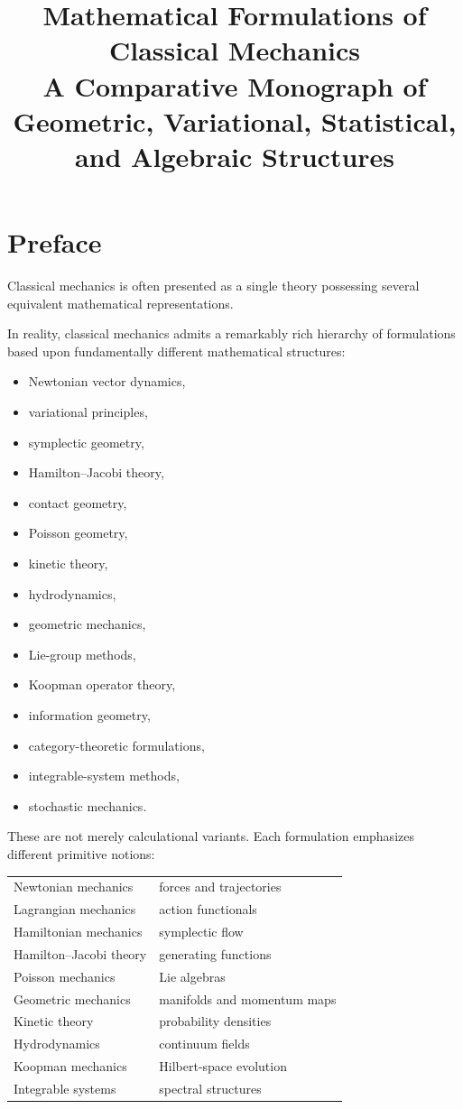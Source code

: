 \documentclass[11pt]{book}
\title{Mathematical Formulations of Classical Mechanics\\
A Comparative Monograph of Geometric, Variational, Statistical, and Algebraic Structures}
\author{}
\date{}
\begin{document}
\maketitle
\tableofcontents

\chapter*{Preface}

Classical mechanics is often presented as a single theory possessing several equivalent mathematical representations.

In reality, classical mechanics admits a remarkably rich hierarchy of formulations based upon fundamentally different mathematical structures:

\begin{itemize}
\item Newtonian vector dynamics,
\item variational principles,
\item symplectic geometry,
\item Hamilton--Jacobi theory,
\item contact geometry,
\item Poisson geometry,
\item kinetic theory,
\item hydrodynamics,
\item geometric mechanics,
\item Lie-group methods,
\item Koopman operator theory,
\item information geometry,
\item category-theoretic formulations,
\item integrable-system methods,
\item stochastic mechanics.
\end{itemize}

These are not merely calculational variants. Each formulation emphasizes different primitive notions:

\begin{center}
\begin{tabular}{ll}
Newtonian mechanics & forces and trajectories \\
Lagrangian mechanics & action functionals \\
Hamiltonian mechanics & symplectic flow \\
Hamilton--Jacobi theory & generating functions \\
Poisson mechanics & Lie algebras \\
Geometric mechanics & manifolds and momentum maps \\
Kinetic theory & probability densities \\
Hydrodynamics & continuum fields \\
Koopman mechanics & Hilbert-space evolution \\
Integrable systems & spectral structures
\end{tabular}
\end{center}
\end{document}
